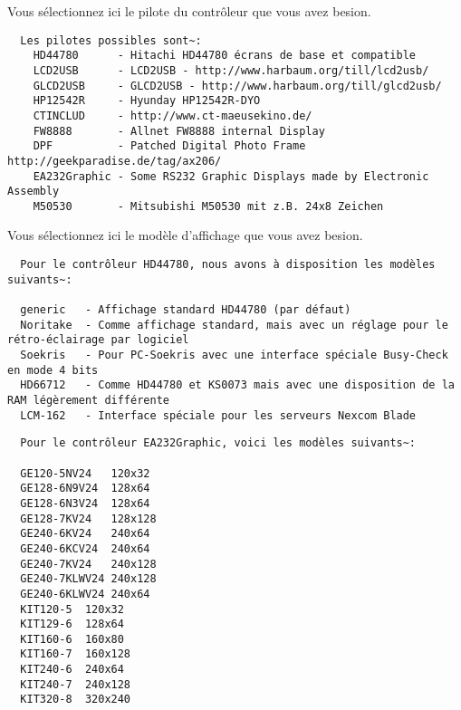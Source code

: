 \begin{description}

  Vous sélectionnez ici le pilote du contrôleur que vous avez besion.

\begin{example}
\begin{verbatim}
  Les pilotes possibles sont~:
    HD44780      - Hitachi HD44780 écrans de base et compatible
    LCD2USB      - LCD2USB - http://www.harbaum.org/till/lcd2usb/
    GLCD2USB     - GLCD2USB - http://www.harbaum.org/till/glcd2usb/
    HP12542R     - Hyunday HP12542R-DYO
    CTINCLUD     - http://www.ct-maeusekino.de/
    FW8888       - Allnet FW8888 internal Display
    DPF          - Patched Digital Photo Frame http://geekparadise.de/tag/ax206/
    EA232Graphic - Some RS232 Graphic Displays made by Electronic Assembly
    M50530       - Mitsubishi M50530 mit z.B. 24x8 Zeichen
\end{verbatim}
\end{example}



  Vous sélectionnez ici le modèle d'affichage que vous avez besion.

\begin{example}
\begin{verbatim}
  Pour le contrôleur HD44780, nous avons à disposition les modèles suivants~:

  generic	- Affichage standard HD44780 (par défaut)
  Noritake	- Comme affichage standard, mais avec un réglage pour le rétro-éclairage par logiciel
  Soekris	- Pour PC-Soekris avec une interface spéciale Busy-Check en mode 4 bits
  HD66712	- Comme HD44780 et KS0073 mais avec une disposition de la RAM légèrement différente
  LCM-162	- Interface spéciale pour les serveurs Nexcom Blade
\end{verbatim}
\end{example}

\begin{example}
\begin{verbatim}
  Pour le contrôleur EA232Graphic, voici les modèles suivants~:

  GE120-5NV24	120x32
  GE128-6N9V24	128x64
  GE128-6N3V24	128x64
  GE128-7KV24	128x128
  GE240-6KV24	240x64
  GE240-6KCV24	240x64
  GE240-7KV24	240x128
  GE240-7KLWV24	240x128
  GE240-6KLWV24	240x64
  KIT120-5	120x32
  KIT129-6	128x64
  KIT160-6	160x80
  KIT160-7	160x128
  KIT240-6	240x64
  KIT240-7	240x128
  KIT320-8	320x240
\end{verbatim}
\end{example}


\end{description}
